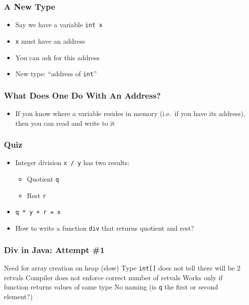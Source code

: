 \begin{frame}
  \frametitle{A New Type}
  \begin{itemize}
    \item Say we have a variable {\tt int x}
    \item {\tt x} must have an address
    \item You can ask for this address
    \item New type: ``address of {\tt int}''
  \end{itemize}
  \vskip1cm
\end{frame}

\begin{frame}
  \frametitle{What Does One Do With An Address?}
  \begin{itemize}
  \item If you know where a variable resides in memory
        (i.e.\ if you have its address), then you can read and write to it
  \end{itemize}
  \vskip1cm
\end{frame}

\begin{frame}
  \frametitle{Quiz}
  \begin{itemize}
    \item Integer division {\tt x / y} has two results:
          \begin{itemize}
            \item Quotient {\tt q}
            \item Rest {\tt r}
          \end{itemize}
    \item {\tt q * y + r = x}
    \item How to write a function {\tt div} that returns quotient and rest?
  \end{itemize}
\end{frame}

\begin{frame}
  \frametitle{Div in Java: Attempt \#1}
  \vskip5mm
  \begin{procontralist}
    \con Need for array creation on heap (slow)
    \con Type \texttt{int[]} does not tell there will be 2 retvals
    \con Compiler does not enforce correct number of retvals
    \con Works only if function returns values of same type
    \con No naming (is {\tt q} the first or second element?)
  \end{procontralist}
\end{frame}

